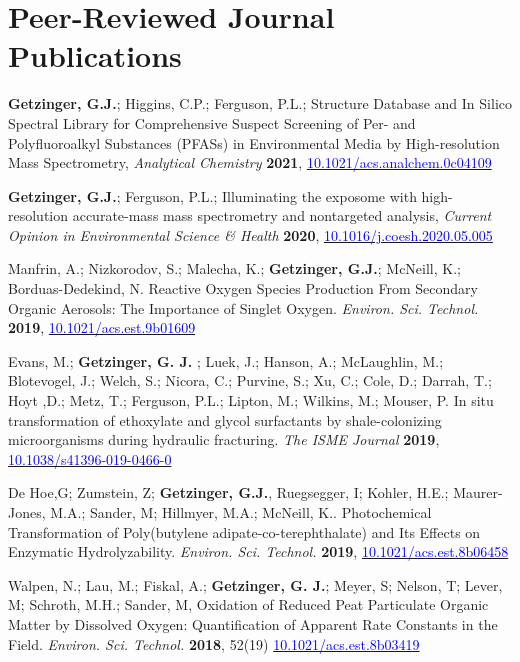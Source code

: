 \documentclass[letterpaper,10pt]{article}
\begin{document}
\section{Peer-Reviewed Journal Publications}
\begin{etaremune}
%
\item {\bfseries Getzinger, G.J.}; Higgins, C.P.; Ferguson, P.L.;  Structure Database and In Silico Spectral Library for Comprehensive Suspect Screening of Per- and Polyfluoroalkyl Substances (PFASs) in Environmental Media by High-resolution Mass Spectrometry, \emph{Analytical Chemistry} {\bfseries 2021}, \href{https://doi.org/10.1021/acs.analchem.0c04109}{\textcolor{blue}{10.1021/acs.analchem.0c04109}}
%
\item {\bfseries Getzinger, G.J.}; Ferguson, P.L.;  Illuminating the exposome with high-resolution accurate-mass mass spectrometry and nontargeted analysis, \emph{Current Opinion in Environmental Science \& Health} {\bfseries 2020}, \href{https://doi.org/10.1016/j.coesh.2020.05.005}{\textcolor{blue}{10.1016/j.coesh.2020.05.005}}
% 
\item Manfrin, A.; Nizkorodov, S.; Malecha, K.; {\bfseries Getzinger, G.J.}; McNeill, K.; Borduas-Dedekind, N. Reactive Oxygen Species Production From Secondary Organic Aerosols: The Importance of Singlet Oxygen.  \emph{Environ. Sci. Technol.} {\bfseries 2019}, \href{https://doi.org/10.1021/acs.est.9b01609}{\textcolor{blue}{10.1021/acs.est.9b01609}}
%
\item Evans, M.;  {\bfseries Getzinger, G. J.} ; Luek, J.; Hanson, A.; McLaughlin, M.; Blotevogel, J.; Welch, S.; Nicora, C.; Purvine, S.; Xu, C.; Cole, D.; Darrah, T.; Hoyt ,D.; Metz, T.; Ferguson, P.L.; Lipton, M.; Wilkins, M.; Mouser, P. In situ transformation of ethoxylate and glycol surfactants by shale-colonizing microorganisms during hydraulic fracturing. \emph{The ISME Journal} {\bfseries 2019}, \href{https://doi.org/10.1038/s41396-019-0466-0}{\textcolor{blue}{10.1038/s41396-019-0466-0}}
%
\item De Hoe,G; Zumstein, Z; {\bfseries Getzinger, G.J.}, Ruegsegger, I; Kohler, H.E.; Maurer-Jones, M.A.; Sander, M; Hillmyer, M.A.; McNeill, K.. Photochemical Transformation of Poly(butylene adipate-co-terephthalate) and Its Effects on Enzymatic Hydrolyzability. \emph{Environ. Sci. Technol.} {\bfseries 2019}, \href{http://dx.doi.org/10.1021/acs.est.8b06458}{\textcolor{blue}{10.1021/acs.est.8b06458}}
%
\item Walpen, N.; Lau, M.; Fiskal, A.; {\bfseries Getzinger, G. J.}; Meyer, S; Nelson, T; Lever, M; Schroth, M.H.; Sander, M, Oxidation of Reduced Peat Particulate Organic Matter by Dissolved Oxygen: Quantification of Apparent Rate Constants in the Field. \emph{Environ. Sci. Technol.} {\bfseries 2018}, 52(19) \href{http://dx.doi.org/10.1021/acs.est.8b03419}{\textcolor{blue}{10.1021/acs.est.8b03419}}

\end{etaremune}
\end{document}
